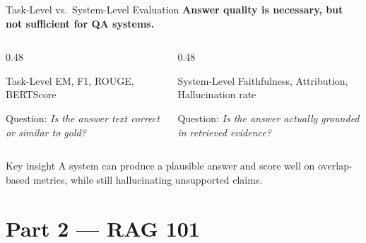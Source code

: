 \documentclass[aspectratio=169, xcolor=table]{beamer}
\newif\ifanimated
\newcommand{\cpause}{\ifanimated\pause\fi}
\begin{document}
\begin{frame}[shrink=10]{Task-Level vs.\ System-Level Evaluation}
\textbf{Answer quality is necessary, but not sufficient for QA systems.}

\vspace{0.7em}
\begin{columns}[T]
\begin{column}{0.48\textwidth}
\begin{block}{Task-Level}
EM, F1, ROUGE, BERTScore

\footnotesize
Question: \emph{Is the answer text correct or similar to gold?}
\end{block}
\end{column}
\begin{column}{0.48\textwidth}
\begin{block}{System-Level}
Faithfulness, Attribution, Hallucination rate

\footnotesize
Question: \emph{Is the answer actually grounded in retrieved evidence?}
\end{block}
\end{column}
\end{columns}

\vspace{0.7em}
\cpause
\begin{block}{Key insight}
A system can produce a plausible answer and score well on overlap-based metrics,
while still hallucinating unsupported claims.
\end{block}
\end{frame}
 

\section{Part 2 --- RAG 101}


\begin{frame}[plain]
\sectionpage
\end{frame}
\end{document}
